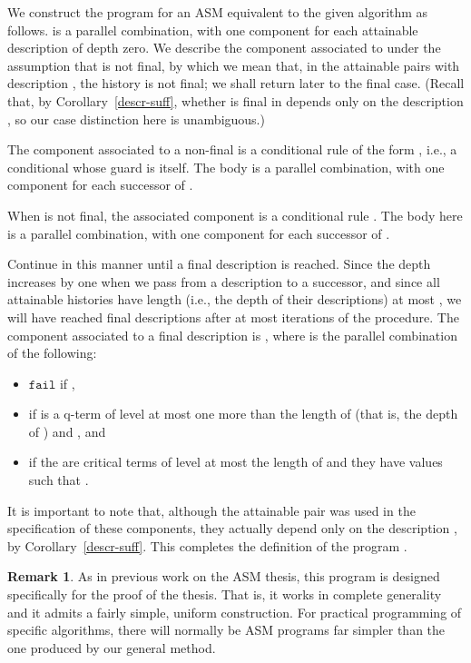\documentclass{LMCS}
\theoremstyle{definition}
\newtheorem{rmk}[thm]{Remark}
\newenvironment{ls}{\begin{itemize}}{\end{itemize}}
\newcommand{\ttt}[1]{\ensuremath{\mathtt {#1}}}
\begin{document}
We construct the program  for an ASM equivalent to the given
algorithm  as follows.   is a parallel combination, with one
component for each attainable description  of depth zero. We
describe the component associated to  under the assumption
that  is not final, by which we mean that, in the attainable
pairs  with description , the history  is not
final; we shall return later to the final case.  (Recall
that, by Corollary~\ref{descr-suff}, whether  is final in 
depends only on the description , so our case
distinction here is unambiguous.)

The component associated to a non-final  is a conditional rule
of the form , i.e., a
conditional whose guard is  itself.  The body  is a
parallel combination, with one component for each successor 
of .

When  is not final, the associated component is
a conditional rule .  The
body  here is a parallel combination, with one component
for each successor  of .

Continue in this manner until a final description  is reached.
Since the depth increases by one when we pass from a description to a
successor, and since all attainable histories have length (i.e., the
depth of their descriptions) at most , we will have reached final
descriptions after at most  iterations of the procedure.  The
component associated to a final description  is
, where  is
the parallel combination of the following:
\begin{ls}
\item \ttt{fail} if ,
\item  if  is a q-term of level at most one more
than the length of  (that is, the depth of ) and
, and
\item  if the  are critical terms of
level at most
  the length of  and they have values  such
  that .
\end{ls}
It is important to note that, although the attainable pair
 was used in the specification of these components, they
actually depend only on the description , by
Corollary~\ref{descr-suff}. This completes the definition of the
program .

\begin{rmk}
  As in previous work on the ASM thesis, this program  is
  designed specifically for the proof of the thesis.  That is, it
  works in complete generality and it admits a fairly simple, uniform
  construction.  For practical programming of specific algorithms,
  there will normally be ASM programs far simpler than the one
  produced by our general method.
\end{rmk}
\end{document}
